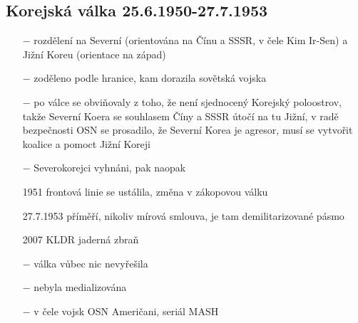 \documentclass{article}
\begin{document}
\subsection*{Korejská válka 25.6.1950-27.7.1953}
\begin{itemize}
    \vspace{-0.5em}
    \setlength\itemsep{0.15em}
    \item[$-$] rozdělení na Severní (orientována na Čínu a SSSR, v čele Kim Ir-Sen) a Jižní Koreu (orientace na západ)
    \item[$-$] zoděleno podle hranice, kam dorazila sovětská vojska
    \item[$-$] po válce se obviňovaly z toho, že není sjednocený Korejský poloostrov, takže Severní Koera se souhlasem Číny a SSSR útočí na tu Jižní, v radě bezpečnosti OSN se prosadilo, že Severní Korea je agresor, musí se vytvořit koalice a pomoct Jižní Koreji
    \item[$-$] Severokorejci vyhnáni, pak naopak
    \item[1951] frontová linie se ustálila, změna v zákopovou válku
    \item[27.7.1953] příměří, nikoliv mírová smlouva, je tam demilitarizované pásmo
    \item[2007] KLDR jaderná zbraň
    \item[$-$] válka vůbec nic nevyřešila
    \item[$-$] nebyla medializována
    \item[$-$] v čele vojsk OSN Američani, seriál MASH
\end{itemize}
\end{document}

